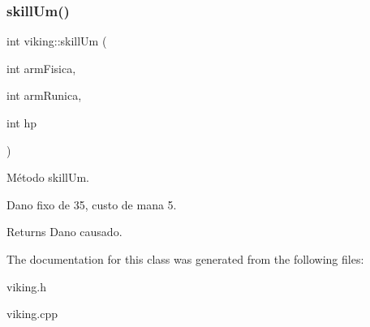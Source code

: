 \subsubsection{\texorpdfstring{skill\+Um()}{skillUm()}}
{\footnotesize\ttfamily int viking\+::skill\+Um (\begin{DoxyParamCaption}\item[{int}]{arm\+Fisica,  }\item[{int}]{arm\+Runica,  }\item[{int}]{hp }\end{DoxyParamCaption})}



Método skill\+Um. 

Dano fixo de 35, custo de mana 5. \begin{DoxyReturn}{Returns}
Dano causado. 
\end{DoxyReturn}


The documentation for this class was generated from the following files\+:\begin{DoxyCompactItemize}
\item 
viking.\+h\item 
viking.\+cpp\end{DoxyCompactItemize}

